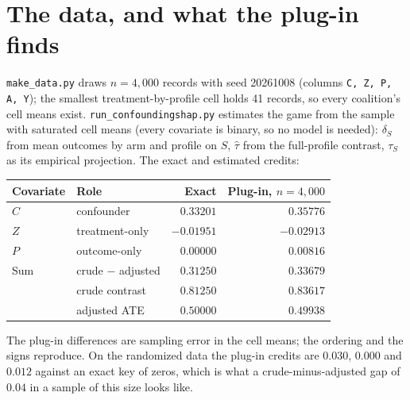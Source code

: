 \documentclass[10pt,letterpaper]{article}
\begin{document}
\newpage
\section{The data, and what the plug-in finds}
\texttt{make\_data.py} draws $n = 4{,}000$ records with seed 20261008 (columns \texttt{C, Z, P, A, Y}); the smallest treatment-by-profile cell holds 41 records, so every coalition's cell means exist. \texttt{run\_confoundingshap.py} estimates the game from the sample with saturated cell means (every covariate is binary, so no model is needed): $\delta_S$ from mean outcomes by arm and profile on $S$, $\hat\tau$ from the full-profile contrast, $\tau_S$ as its empirical projection. The exact and estimated credits:
\begin{center}
\begin{tabular}{@{}llrr@{}}
\toprule Covariate & Role & Exact & Plug-in, $n=4{,}000$\\\midrule
$C$ & confounder & $0.33201$ & $0.35776$\\
$Z$ & treatment-only & $-0.01951$ & $-0.02913$\\
$P$ & outcome-only & $0.00000$ & $0.00816$\\
\midrule Sum & crude $-$ adjusted & $0.31250$ & $0.33679$\\
& crude contrast & $0.81250$ & $0.83617$\\
& adjusted ATE & $0.50000$ & $0.49938$\\
\bottomrule
\end{tabular}
\end{center}
The plug-in differences are sampling error in the cell means; the ordering and the signs reproduce. On the randomized data the plug-in credits are $0.030$, $0.000$ and $0.012$ against an exact key of zeros, which is what a crude-minus-adjusted gap of $0.04$ in a sample of this size looks like.
\end{document}
